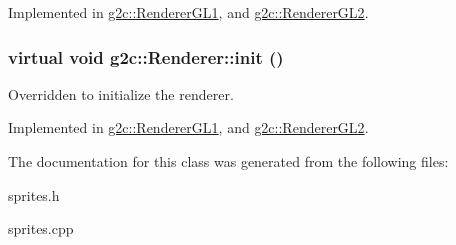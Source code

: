 Implemented in \hyperlink{classg2c_1_1_renderer_g_l1_a26b67e30372294a022b981fa6b0d76c4}{g2c::RendererGL1}, and \hyperlink{classg2c_1_1_renderer_g_l2_a42c4be1e991664f9a2ba8ef013cb00c1}{g2c::RendererGL2}.\hypertarget{classg2c_1_1_renderer_adcfacb02cf062a77f0fb71ab30dbae76}{
\subsubsection[{init}]{\setlength{\rightskip}{0pt plus 5cm}virtual void g2c::Renderer::init ()}}
\label{classg2c_1_1_renderer_adcfacb02cf062a77f0fb71ab30dbae76}
Overridden to initialize the renderer. 

Implemented in \hyperlink{classg2c_1_1_renderer_g_l1_a3577eea69cf61c38dc3595b24251fab7}{g2c::RendererGL1}, and \hyperlink{classg2c_1_1_renderer_g_l2_acd65c8c77dbecbe19c2bb19ef3847ce5}{g2c::RendererGL2}.

The documentation for this class was generated from the following files:\begin{DoxyCompactItemize}
\item 
sprites.h\item 
sprites.cpp\end{DoxyCompactItemize}
